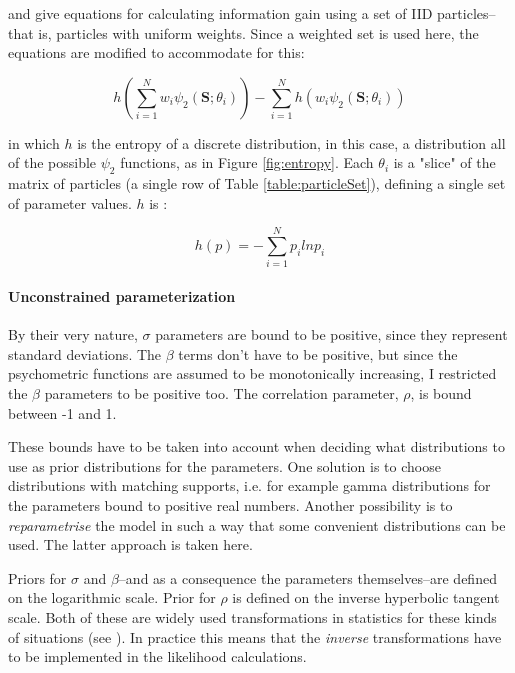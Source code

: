 \documentclass{article}\usepackage{knitr}
\begin{document}
\citet{kujalalukka2006} and \citet{kujala2011} give equations for calculating information gain using a set of IID particles--that is, particles with uniform weights. Since a weighted set is used here, the equations are modified to accommodate for this:

\begin{equation}
h(\sum_{i=1}^N w_i \psi_2(\bm{S};\theta_i)) - \sum_{i=1}^N h(w_i \psi_2(\bm{S};\theta_i)) 
\end{equation}

in which $h$ is the entropy of a discrete distribution, in this case, a distribution all of the possible $\psi_2$ functions, as in Figure \ref{fig:entropy}. Each $\theta_i$ is a "slice" of the matrix of particles (a single  row of Table \ref{table:particleSet}), defining a single set of parameter values. $h$ is \citep{kontsevichtyler1999}:

\begin{equation}
h(p) = -\sum_{i = 1}^{N} p_i ln p_i
\end{equation}

\paragraph{Unconstrained parameterization}

By their very nature, $\sigma$ parameters are bound to be positive, since they represent standard deviations. The $\beta$ terms don't have to be positive, but since the psychometric functions are assumed to be monotonically increasing, I restricted the $\beta$ parameters to be positive too. The correlation parameter, $\rho$, is bound between -1 and 1. 

These bounds have to be taken into account when deciding what distributions to use as prior distributions for the parameters. One solution is to choose distributions with matching supports, i.e. for example gamma distributions for the parameters bound to positive real numbers. Another possibility is to \textit{reparametrise} the model in such a way that some convenient distributions can be used. The latter approach is taken here. 

Priors for $\sigma$ and $\beta$--and as a consequence the parameters themselves--are defined on the logarithmic scale. Prior for $\rho$ is defined on the inverse hyperbolic tangent scale. Both of these are widely used transformations in statistics for these kinds of situations (see \citet[Chapter 22]{stan_manual}). In practice this means  that the \textit{inverse} transformations have to be implemented in the likelihood calculations.
\end{document}
